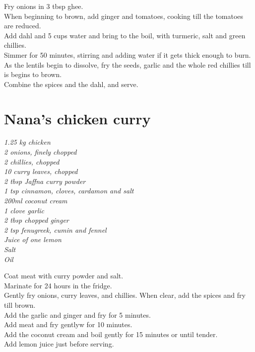 \documentclass{tufte-book}
\begin{document}
Fry onions in 3 tbsp ghee. 
\\When beginning to brown, add ginger and tomatoes, cooking till the tomatoes are reduced.
\\Add dahl and 5 cups water and bring to the boil, with turmeric, salt and green chillies.
\\Simmer for 50 minutes, stirring and adding water if it gets thick enough to burn.
\\As the lentils begin to dissolve, fry the seeds, garlic and the whole red chillies till is begins to brown. 
\\Combine the spices and the dahl, and serve.


\section{Nana's chicken curry}

\emph{1.25 kg chicken
\\2 onions, finely chopped
\\2 chillies, chopped
\\10 curry leaves, chopped
\\2 tbsp Jaffna curry powder
\\1 tsp cinnamon, cloves, cardamon and salt
\\200ml coconut cream
\\1 clove garlic
\\2 tbsp chopped ginger
\\2 tsp fenugreek, cumin and fennel
\\Juice of one lemon
\\Salt
\\Oil}

Coat meat with curry powder and salt. 
\\Marinate for 24 hours in the fridge.
\\Gently fry onions, curry leaves, and chillies. When clear, add the spices and fry till brown.
\\Add the garlic and ginger and fry for 5 minutes.
\\Add meat and fry gentlyw for 10 minutes.
\\Add the coconut cream and boil gently for 15 minutes or until tender.
\\Add lemon juice just before serving.
\end{document}
